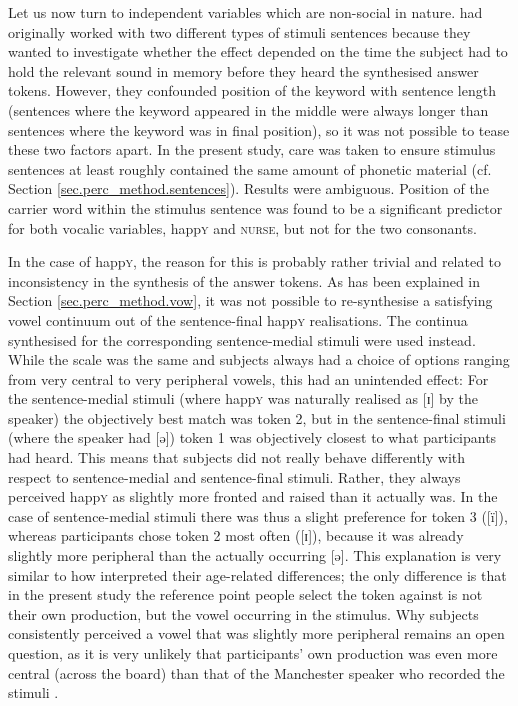 Let us now turn to independent variables which are non-social in nature.
\textcite{hayetal2006a} had originally worked with two different types of stimuli sentences because they wanted to investigate whether the  effect depended on the time the subject had to hold the relevant sound in memory before they heard the synthesised answer tokens.
However, they confounded position of the keyword with sentence length (sentences where the keyword appeared in the middle were always longer than sentences where the keyword was in final position), so it was not possible to tease these two factors apart.
In the present study, care was taken to ensure stimulus sentences at least roughly contained the same amount of phonetic material (cf. Section \ref{sec.perc_method.sentences}).
Results were ambiguous.
Position of the carrier word within the stimulus sentence was found to be a significant predictor for both vocalic variables, happ\textsc{y} and \textsc{nurse}, but not for the two consonants.

In the case of happ\textsc{y}, the reason for this is probably rather trivial and related to inconsistency in the synthesis of the answer tokens.
As has been explained in Section \ref{sec.perc_method.vow}, it was not possible to re-synthesise a satisfying vowel continuum out of the sentence-final happ\textsc{y} realisations.
The continua synthesised for the corresponding sentence-medial stimuli were used instead.
While the scale was the same and subjects always had a choice of options ranging from very central to very peripheral vowels, this had an unintended effect: For the sentence-medial stimuli (where happ\textsc{y} was naturally realised as [ɪ] by the speaker) the objectively best match was token 2, but in the sentence-final stimuli (where the speaker had [ə]) token 1 was objectively closest to what participants had heard.
This means that subjects did not really behave differently with respect to sentence-medial and sentence-final stimuli.
Rather, they always perceived happ\textsc{y} as slightly more fronted and raised than it actually was.
In the case of sentence-medial stimuli there was thus a slight preference for token 3 ([ï]), whereas participants chose token 2 most often ([ɪ]), because it was already slightly more peripheral than the actually occurring [ə].
This explanation is very similar to how \textcite[878--879; see also above]{haydrager2010} interpreted their age-related differences; the only difference is that in the present study the reference point people select the token against is not their own production, but the vowel occurring in the stimulus.
Why subjects consistently perceived a vowel that was slightly more peripheral remains an open question, as it is very unlikely that participants' own production was even more central (across the board) than that of the Manchester speaker who recorded the stimuli \parencite[cf.][878--879]{haydrager2010}.

